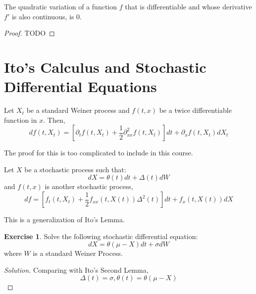 \documentclass[12pt,letterpaper]{book}
\theoremstyle{definition}
\newtheorem*{exercise}{Exercise}
\newenvironment{solution}
  {\renewcommand\qedsymbol{$\blacksquare$}\begin{proof}[Solution]}
  {\end{proof}}
\begin{document}
\begin{theorem}
  The quadratic variation of a function $f$ that is differentiable and whose derivative $f'$ is also continuous, is 0. 
\end{theorem}
\begin{proof}
  TODO
\end{proof}

\section{Ito's Calculus and Stochastic Differential Equations}

\begin{lemma}
Let $X_t$ be a standard Weiner process and $f(t,x)$ be a twice differentiable function in $x$. Then,
\[df(t,X_t) = \left[ \partial_t f(t,X_t) + \frac{1}{2} \partial^2_{xx} f(t,X_t) \right ]  dt + \partial_x f(t,X_t) dX_t \]
\end{lemma}

The proof for this is too complicated to include in this course.

\begin{lemma}
  Let $X$ be a stochastic process such that:
  \[dX = \theta(t) dt + \Delta(t) dW\]
  and $f(t,x)$ is another stochastic process,
  \[df = \left[ f_t(t,X_t) + \frac{1}{2} f_{xx}(t,X(t)) \Delta^2(t) \right] dt + f_{x}(t,X(t)) dX \]
\end{lemma}

This is a generalization of Ito's Lemma.

\begin{exercise}
  Solve the following stochastic differential equation:
  \[dX = \theta (\mu - X) dt + \sigma dW\]
  where $W$ is a standard Weiner Process.
\end{exercise}
\begin{solution}
  Comparing with Ito's Second Lemma,
  \[\Delta(t) = \sigma, \theta(t) = \theta (\mu - X)\]
\end{solution}
\end{document}
